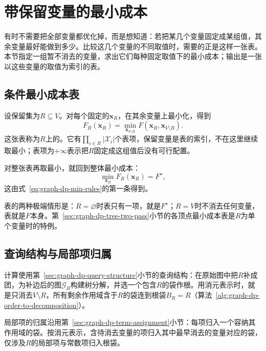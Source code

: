
\section{带保留变量的最小成本}
\label{sec:graph-dp-retained-min}

有时不需要把全部变量都优化掉，而是想知道：若把某几个变量固定成某组值，其余变量最好能做到多少。比较这几个变量的不同取值时，需要的正是这样一张表。本节指定一组暂不消去的变量，求出它们每种固定取值下的最小成本；输出是一张以这些变量的取值为索引的表。

\subsection{条件最小成本表}
\label{sec:graph-dp-conditional-table}

设保留集为$R\subseteq V$。对每个固定的$\bm x_R$，在其余变量上最小化，得到
\begin{equation}
F_R(\bm x_R)=\min_{\bm x_{V\setminus R}}F(\bm x_R,\bm x_{V\setminus R}).
\label{eq:graph-dp-conditional-table}
\end{equation}
这张表称为$R$上的。它有$\prod_{i\in R}|\mathcal X_i|$个表项，保留变量是表的索引，不在这里继续取最小；表项为$+\infty$表示把$R$固定成这组值后没有可行配置。

对整张表再取最小，就回到整体最小成本：
\[
\min_{\bm x_R}F_R(\bm x_R)=F^\star,
\]
这由式~\eqref{eq:graph-dp-min-rules}的第一条得到。

表的两种极端情形是：$R=\varnothing$时表只有一项，就是$F^\star$；$R=V$时不消去任何变量，表就是$F$本身。第~\ref{sec:graph-dp-tree-two-pass}小节的各顶点最小成本表是$R$为单个变量时的特例。

\subsection{查询结构与局部项归属}
\label{sec:graph-dp-query-assignment}

计算使用第~\ref{sec:graph-dp-query-structure}小节的查询结构：在原始图中把$R$补成团，为补边后的图$\mathcal G_R$构建树分解，并选一个包含$R$的袋作根。用消元表示时，就是只消去$V\setminus R$，所有剩余作用域含于$R$的袋连到根袋$B_R=R$（算法~\ref{alg:graph-dp-order-to-decomposition}）。

局部项的归属沿用第~\ref{sec:graph-dp-term-assignment}小节：每项归入一个容纳其作用域的袋。按消元表示，含待消去变量的项归入其中最早消去的变量对应的袋，仅涉及$R$的局部项与常数项归入根袋。

